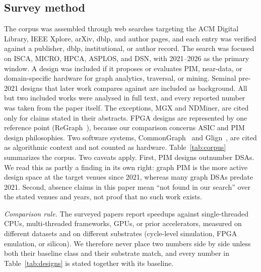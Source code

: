 \documentclass[journal,onecolumn]{IEEEtran}
\begin{document}
\subsection{Survey method}
The corpus was assembled through web searches targeting the ACM Digital Library, IEEE Xplore, arXiv, dblp, and author pages, and each entry was verified against a publisher, dblp, institutional, or author record. The search was focused on ISCA, MICRO, HPCA, ASPLOS, and DSN, with 2021--2026 as the primary window. A design was included if it proposes or evaluates PIM, near-data, or domain-specific hardware for graph analytics, traversal, or mining. Seminal pre-2021 designs that later work compares against are included as background. All but two included works were analysed in full text, and every reported number was taken from the paper itself. The exceptions, MGX and NDMiner, are cited only for claims stated in their abstracts. FPGA designs are represented by one reference point (ReGraph~\cite{chen2022regraph}), because our comparison concerns ASIC and PIM design philosophies. Two software systems, CommonGraph~\cite{afarin2023commongraph} and Glign~\cite{yin2023glign}, are cited as algorithmic context and not counted as hardware. Table~\ref{tab:corpus} summarizes the corpus. Two caveats apply. First, PIM designs outnumber DSAs. We read this as partly a finding in its own right: graph PIM is the more active design space at the target venues since 2021, whereas many graph DSAs predate 2021. Second, absence claims in this paper mean ``not found in our search'' over the stated venues and years, not proof that no such work exists.

\emph{Comparison rule.} The surveyed papers report speedups against single-threaded CPUs, multi-threaded frameworks, GPUs, or prior accelerators, measured on different datasets and on different substrates (cycle-level simulation, FPGA emulation, or silicon). We therefore never place two numbers side by side unless both their baseline class and their substrate match, and every number in Table~\ref{tab:designs} is stated together with its baseline.
\end{document}
